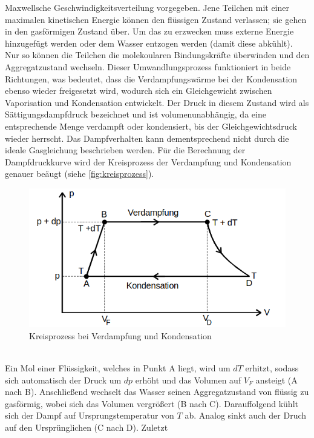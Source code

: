 Maxwellsche Geschwindigkeitsverteilung vorgegeben. Jene Teilchen mit einer 
maximalen kinetischen Energie können den flüssigen Zustand verlassen; sie gehen 
in den gasförmigen Zustand über. Um das zu erzwecken muss externe Energie 
hinzugefügt werden oder dem Wasser entzogen werden (damit diese abkühlt). Nur 
so können die Teilchen die molekoularen Bindungskräfte überwinden und den 
Aggregatzustand wechseln. Dieser Umwandlungsprozess funktioniert in beide 
Richtungen, was bedeutet, dass die Verdampfungswärme bei der Kondensation ebenso
wieder freigesetzt wird, wodurch sich ein Gleichgewicht zwischen Vaporisation und
Kondensation entwickelt. Der Druck in diesem Zustand wird als Sättigungsdampfdruck 
bezeichnet und ist volumenunabhängig, da eine entsprechende Menge verdampft oder 
kondensiert, bis der Gleichgewichtsdruck wieder herrscht. Das Dampfverhalten 
kann dementsprechend nicht durch die ideale Gasgleichung beschrieben werden.
Für die Berechnung der Dampfdruckkurve wird der Kreisprozess der Verdampfung 
und Kondensation genauer beäugt (siehe \autoref{fig:kreisprozess}).
\begin{figure}[h]
    \centering
        \centering
        \includegraphics[width=\textwidth]{Bilder/kreisprozess.png}
        \caption{Kreisprozess bei Verdampfung und Kondensation \cite{kreisprozess}}
    \hfill
    \label{fig:kreisprozess}
\end{figure}
\\
Ein Mol einer Flüssigkeit, welches in Punkt A liegt, wird um $dT$ erhitzt, 
sodass sich automatisch der Druck um $dp$ erhöht und das Volumen auf $V_F$ 
ansteigt (A nach B). Anschließend wechselt das Wasser seinen Aggregatzustand
von flüssig zu gasförmig, wobei sich das Volumen vergrößert (B nach C).
Darauffolgend kühlt sich der Dampf auf Ursprungstemperatur von $T$ ab.
Analog sinkt auch der Druch auf den Ursprünglichen (C nach D). Zuletzt 
